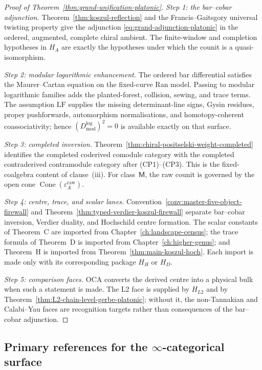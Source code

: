 \begin{proof}[Proof of Theorem~\ref{thm:grand-unification-platonic}]
\emph{Step 1: the bar--cobar adjunction.}
Theorem~\ref{thm:koszul-reflection} and the Francis--Gaitsgory
universal twisting property \cite[\S6]{FG12} give the adjunction
\eqref{eq:grand-adjunction-platonic} in the ordered, augmented,
complete chiral ambient. The finite-window and completion hypotheses
in $H_A$ are exactly the hypotheses under which the counit is a
quasi-isomorphism.

\emph{Step 2: modular logarithmic enhancement.}
The ordered bar differential satisfies the Maurer--Cartan equation on
the fixed-curve Ran model. Passing to modular logarithmic families
adds the planted-forest, collision, sewing, and trace terms. The
assumption $\mathrm{LF}$ supplies the missing determinant-line signs,
Gysin residues, proper pushforwards, automorphism normalisations, and
homotopy-coherent coassociativity; hence
$(D_{\mathrm{mod}}^{\log})^2=0$ is available exactly on that surface.

\emph{Step 3: completed inversion.}
Theorem~\ref{thm:chiral-positselski-weight-completed} identifies the
completed coderived comodule category with the completed
contraderived contramodule category after \textup{(CP1)--(CP3)}. This
is the fixed-coalgebra content of clause~(iii).  For class~$\mathsf M$,
the raw counit is governed by the open cone
$\operatorname{Cone}(\varepsilon_A^{\mathrm{raw}})$.

\emph{Step 4: centre, trace, and scalar lanes.}
Convention~\ref{conv:master-five-object-firewall} and
Theorem~\ref{thm:typed-verdier-koszul-firewall} separate bar--cobar
inversion, Verdier duality, and Hochschild centre formation. The
scalar constants of Theorem~C are imported from
Chapter~\ref{ch:landscape-census}; the trace formula of Theorem~D is
imported from Chapter~\ref{ch:higher-genus}; and Theorem~H is imported
from Theorem~\ref{thm:main-koszul-hoch}. Each import is made only with
its corresponding package $H_H$ or $H_D$.

\emph{Step 5: comparison faces.}
OCA converts the derived centre into a physical bulk when such a
statement is made. The L2 face is supplied by $H_{L2}$ and by
Theorem~\ref{thm:L2-chain-level-gerbe-platonic}; without it, the
non-Tannakian and Calabi--Yau faces are recognition targets rather
than consequences of the bar--cobar adjunction.
\qedhere
\end{proof}

\subsection{Primary references for the $\infty$-categorical surface}
\label{ssec:grand-theorem-primary-references}


